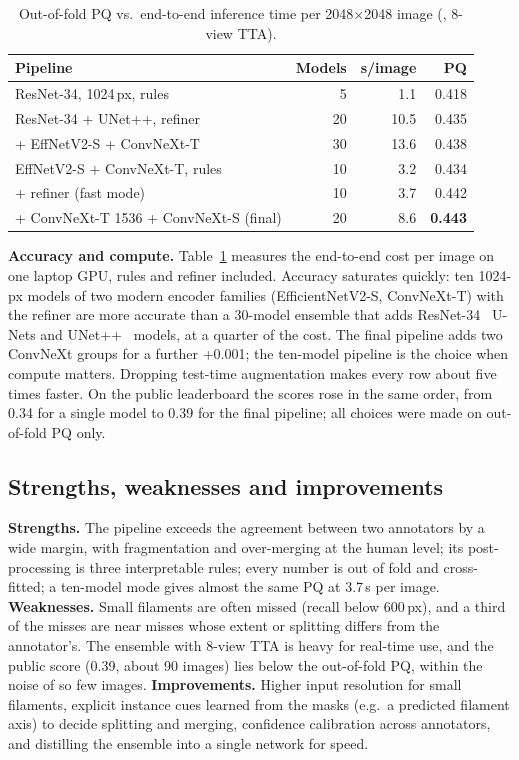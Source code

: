 \documentclass[sigconf]{acmart}
\begin{document}
\begin{table}[t]
\centering
\caption{Out-of-fold PQ vs.\ end-to-end inference time per 2048$\times$2048 image (\effGPU{}, 8-view TTA).}
\label{tab:cost}
\begin{tabularx}{\columnwidth}{@{}Xrrr@{}}
\toprule
Pipeline & Models & s/image & PQ \\
\midrule
ResNet-34, 1024\,px, rules & 5 & 1.1 & 0.418 \\
ResNet-34 + UNet++, refiner & 20 & 10.5 & 0.435 \\
\quad + EffNetV2-S + ConvNeXt-T & 30 & 13.6 & 0.438 \\
EffNetV2-S + ConvNeXt-T, rules & 10 & 3.2 & 0.434 \\
\quad + refiner (fast mode) & 10 & 3.7 & 0.442 \\
\quad + ConvNeXt-T 1536 + ConvNeXt-S (final) & 20 & 8.6 & \textbf{0.443} \\
\bottomrule
\end{tabularx}
\end{table}

\textbf{Accuracy and compute.} Table~\ref{tab:cost} measures the end-to-end cost per image on one laptop GPU, rules and refiner included. Accuracy saturates quickly: ten 1024-px models of two modern encoder families (EfficientNetV2-S, ConvNeXt-T) with the refiner are more accurate than a 30-model ensemble that adds ResNet-34~\cite{he2016resnet} U-Nets and UNet++~\cite{zhou2018unetpp} models, at a quarter of the cost. The final pipeline adds two ConvNeXt groups for a further +0.001; the ten-model pipeline is the choice when compute matters. Dropping test-time augmentation makes every row about five times faster. On the public leaderboard the scores rose in the same order, from 0.34 for a single model to 0.39 for the final pipeline; all choices were made on out-of-fold PQ only.

\subsection{Strengths, weaknesses and improvements}
\textbf{Strengths.} The pipeline exceeds the agreement between two annotators by a wide margin, with fragmentation and over-merging at the human level; its post-processing is three interpretable rules; every number is out of fold and cross-fitted; a ten-model mode gives almost the same PQ at 3.7\,s per image.
\textbf{Weaknesses.} Small filaments are often missed (recall \recallSmall{} below 600\,px), and a third of the misses are near misses whose extent or splitting differs from the annotator's. The ensemble with 8-view TTA is heavy for real-time use, and the public score (0.39, about 90 images) lies below the out-of-fold PQ, within the noise of so few images.
\textbf{Improvements.} Higher input resolution for small filaments, explicit instance cues learned from the masks (e.g.\ a predicted filament axis) to decide splitting and merging, confidence calibration across annotators, and distilling the ensemble into a single network for speed.
\end{document}
